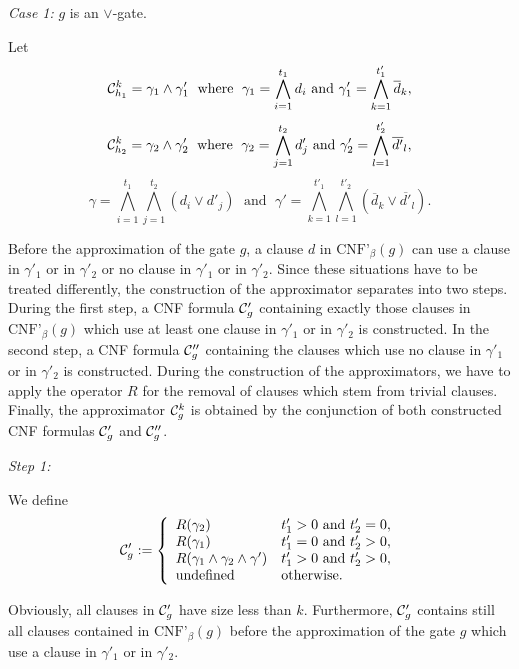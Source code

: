 \documentclass[11pt]{article}
\begin{document}
\pagebreak
\noindent
{\em Case 1:} $g$ is an $\vee$-gate.

\smallskip
Let
$$
{\cal C}_{h_1}^k = \gamma_1 \wedge \gamma'_1 \; \mbox{ where } \; \gamma_1 = \bigwedge_{i=1}^{t_1} d_i \mbox{ and } 
\gamma'_1 =  \bigwedge_{k=1}^{t'_1} \overline{d}_k,
$$
$$
{\cal C}_{h_2}^k = \gamma_2 \wedge \gamma'_2 \; \mbox{ where } \; \gamma_2 = \bigwedge_{j=1}^{t_2} d'_j \mbox{ and }
\gamma'_2 = \bigwedge_{l=1}^{t'_2} \overline{d'}_l,
$$
$$
\gamma = \bigwedge_{i=1}^{t_1}\bigwedge_{j=1}^{t_2} (d_i \vee d'_j)  \; \mbox{ and } \; 
\gamma' = \bigwedge_{k=1}^{t'_1}\bigwedge_{l=1}^{t'_2} (\overline{d}_k \vee \overline{d'}_l).
$$

Before the approximation of the gate $g$, a clause $d$ in $\mbox{CNF'}_{\beta}(g)$ can use a clause in $\gamma'_1$
or in $\gamma'_2$ or no clause in $\gamma'_1$ or in $\gamma'_2$. Since these situations
have to be treated differently, the construction of the approximator separates into two steps.
During the first step, a CNF formula ${\cal C}'_g$ containing exactly those clauses in $\mbox{CNF'}_{\beta}(g)$
which use at least one clause in $\gamma'_1$ or in $\gamma'_2$ is constructed. In the second step, a CNF formula
${\cal C}''_g$ containing the clauses which use no clause in $\gamma'_1$ or in $\gamma'_2$ is constructed. 
During the construction of the approximators, we have to apply the operator $R$ for the removal of clauses which
stem from trivial clauses.
Finally, the approximator ${\cal C}_g^k$ is obtained by the conjunction of both constructed CNF formulas
${\cal C}'_g$ and ${\cal C}''_g$.

\smallskip
\noindent
{\em Step 1:} 

\smallskip
We define
$$
{\cal C}'_g := \left\{ \begin{array}{ll}
                            R(\gamma_2) & t'_1 > 0 \mbox{ and } t'_2 = 0, \\
                            R(\gamma_1) & t'_1 = 0 \mbox{ and } t'_2 > 0, \\ 
                            R(\gamma_1 \wedge \gamma_2 \wedge \gamma') & t'_1 > 0 \mbox{ and } t'_2 > 0, \\ 
                            \mbox{undefined} & \mbox{otherwise.}
                            \end{array}
\right.
$$

Obviously, all clauses in ${\cal C}'_g$ have size less than $k$. Furthermore, ${\cal C}'_g$ contains still all
clauses contained in $\mbox{CNF'}_{\beta}(g)$ before the approximation of the gate $g$ which use a clause in
$\gamma'_1$ or in $\gamma'_2$. 
\end{document}
